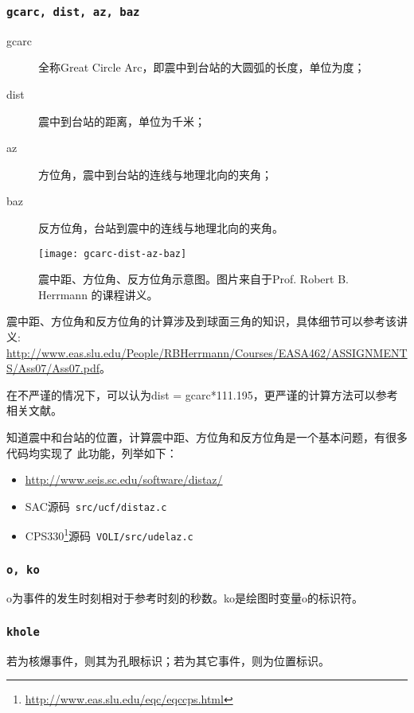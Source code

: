 \subsubsection{\texttt{gcarc, dist, az, baz}}
\begin{description}
\item [gcarc] 全称Great Circle Arc，即震中到台站的大圆弧的长度，单位为度；
\item [dist] 震中到台站的距离，单位为千米；
\item [az] 方位角，震中到台站的连线与地理北向的夹角；
\item [baz] 反方位角，台站到震中的连线与地理北向的夹角。
\end{description}

\begin{figure}[H]
\centering
\texttt{[image: gcarc-dist-az-baz]}
\caption[震中距、方位角、反方位角示意图]{震中距、方位角、反方位角示意图。图片来自于Prof. Robert B. Herrmann 的课程讲义。}
\label{fig:gcarc-dist-az-baz}
\end{figure}

震中距、方位角和反方位角的计算涉及到球面三角的知识，具体细节可以参考该讲义:\\
\scriptsize\url{http://www.eas.slu.edu/People/RBHerrmann/Courses/EASA462/ASSIGNMENTS/Ass07/Ass07.pdf}。

\normalsize
在不严谨的情况下，可以认为dist = gcarc*111.195，更严谨的计算方法可以参考相关文献。

知道震中和台站的位置，计算震中距、方位角和反方位角是一个基本问题，有很多代码均实现了
此功能，列举如下：
\begin{itemize}
\item \url{http://www.seis.sc.edu/software/distaz/}
\item SAC源码~\lstinline{src/ucf/distaz.c}
\item CPS330\footnote{\url{http://www.eas.slu.edu/eqc/eqccps.html}}源码~\lstinline{VOLI/src/udelaz.c}
\end{itemize}

\subsubsection{\texttt{o, ko}}
o为事件的发生时刻相对于参考时刻的秒数。ko是绘图时变量o的标识符。

\subsubsection{\texttt{khole}}
若为核爆事件，则其为孔眼标识；若为其它事件，则为位置标识。

